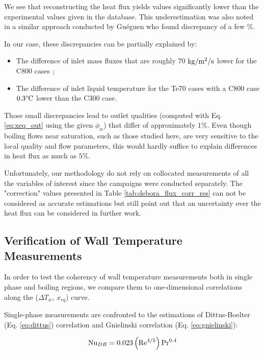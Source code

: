 We see that reconstructing the heat flux yields values significantly lower than the experimental values given in the database. This underestimation was also noted in a similar approach conducted by Guéguen \cite{gueguen_contribution_2013} who found discrepancy of a few \%.

In our case, these discrepancies can be partially explained by:
\begin{itemize}
\item The difference of inlet mass fluxes that are roughly 70 $\text{kg/m$^{2}$/s}$ lower for the C800 cases ;
\item The difference of inlet liquid temperature for the Te70 cases with a C800 case $0.3\degree\mathrm{C}$ lower than the C300 case.
\end{itemize} 

Those small discrepancies lead to outlet qualities (computed with Eq. \ref{eq:xeq_out} using the given $\phi_{w}$) that differ of approximately $1\%$. Even though boiling flows near saturation, such as those studied here, are very sensitive to the local quality and flow parameters, this would hardly suffice to explain differences in heat flux as much as $5\%$.

\npar
\begin{remark*}{}
Unfortunately, our methodology do not rely on collocated measurements of all the variables of interest since the campaigns were conducted separately. The "correction" values presented in Table \ref{tab:debora_flux_corr_res} can not be considered as accurate estimations but still point out that an uncertainty over the heat flux can be considered in further work.
\end{remark*}



\subsection{Verification of Wall Temperature Measurements}

In order to test the coherency of wall temperature measurements both in single phase and boiling regions, we compare them to one-dimensional correlations along the ($\Delta T_{w}$, $x_{eq}$) curve.

\npar

Single-phase measurements are confronted to the estimations of Dittus-Boelter (Eq. \ref{eq:dittus}) correlation and Gnielinski correlation (Eq. \ref{eq:gnielinski}):

\begin{equation}
\mathrm{Nu}_{DB} = 0.023 \left( \mathrm{Re}^{4/5} \right) \mathrm{Pr}^{0.4}
\label{eq:dittus}
\end{equation}

